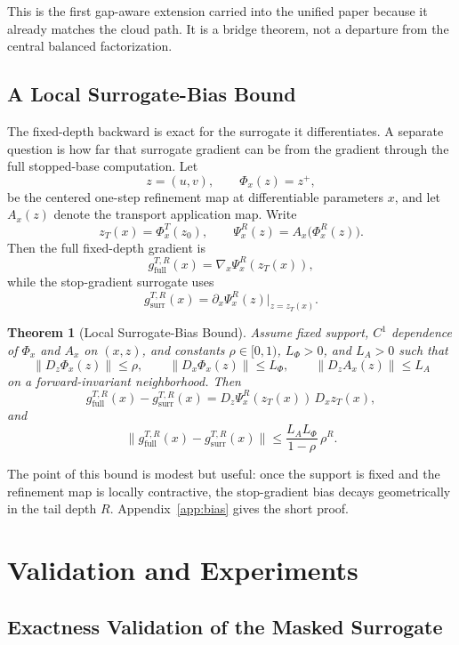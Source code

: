 \documentclass{article}
\newtheorem{theorem}{Theorem}
\begin{document}
This is the first gap-aware extension carried into the unified paper because it already matches the cloud path. It is a bridge theorem, not a departure from the central balanced factorization.

\subsection{A Local Surrogate-Bias Bound}

The fixed-depth backward is exact for the surrogate it differentiates. A separate question is how far that surrogate gradient can be from the gradient through the full stopped-base computation. Let
\[
z=(u,v),\qquad \Phi_x(z)=z^+,
\]
be the centered one-step refinement map at differentiable parameters $x$, and let $A_x(z)$ denote the transport application map. Write
\[
z_T(x)=\Phi_x^T(z_0),
\qquad
\Psi_x^R(z)=A_x\!\bigl(\Phi_x^R(z)\bigr).
\]
Then the full fixed-depth gradient is
\[
g_{\mathrm{full}}^{T,R}(x)=\nabla_x \Psi_x^R(z_T(x)),
\]
while the stop-gradient surrogate uses
\[
g_{\mathrm{surr}}^{T,R}(x)=\partial_x \Psi_x^R(z)\big|_{z=z_T(x)}.
\]

\begin{theorem}[Local Surrogate-Bias Bound]\label{thm:surrogate_bias}
Assume fixed support, $C^1$ dependence of $\Phi_x$ and $A_x$ on $(x,z)$, and constants $\rho\in[0,1)$, $L_\Phi>0$, and $L_A>0$ such that
\[
\|D_z\Phi_x(z)\|\le\rho,
\qquad
\|D_x\Phi_x(z)\|\le L_\Phi,
\qquad
\|D_z A_x(z)\|\le L_A
\]
on a forward-invariant neighborhood. Then
\[
g_{\mathrm{full}}^{T,R}(x)-g_{\mathrm{surr}}^{T,R}(x)
=
D_z\Psi_x^R(z_T(x))\,D_x z_T(x),
\]
and
\[
\bigl\|g_{\mathrm{full}}^{T,R}(x)-g_{\mathrm{surr}}^{T,R}(x)\bigr\|
\le
\frac{L_A L_\Phi}{1-\rho}\,\rho^R.
\]
\end{theorem}

The point of this bound is modest but useful: once the support is fixed and the refinement map is locally contractive, the stop-gradient bias decays geometrically in the tail depth $R$. Appendix~\ref{app:bias} gives the short proof.

\section{Validation and Experiments}

\subsection{Exactness Validation of the Masked Surrogate}
\end{document}
